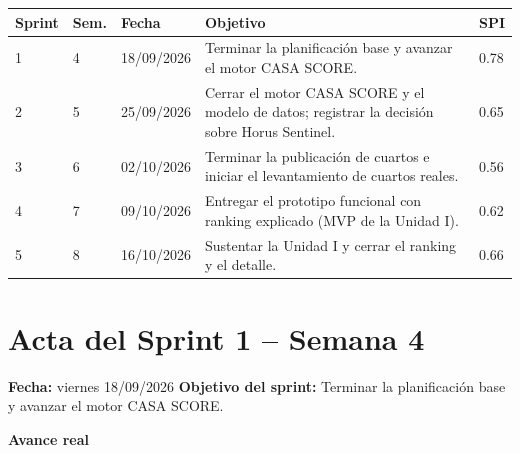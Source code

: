 \documentclass[11pt,a4paper]{article}
\begin{document}
\vspace{0.15cm}
{\small
{}
\noindent\begin{tabularx}{\textwidth}{@{}C{1.3cm} C{1.0cm} P{2.4cm} L C{1.4cm}@{}}
\toprule
{}
\textbf{Sprint} & \textbf{Sem.} & \textbf{Fecha} & \textbf{Objetivo} & \textbf{SPI} \\
\midrule


1 & 4 & 18/09/2026 & Terminar la planificación base y avanzar el motor CASA SCORE. & 0.78 \\

2 & 5 & 25/09/2026 & Cerrar el motor CASA SCORE y el modelo de datos; registrar la decisión sobre Horus Sentinel. & 0.65 \\

3 & 6 & 02/10/2026 & Terminar la publicación de cuartos e iniciar el levantamiento de cuartos reales. & 0.56 \\

4 & 7 & 09/10/2026 & Entregar el prototipo funcional con ranking explicado (MVP de la Unidad I). & 0.62 \\

5 & 8 & 16/10/2026 & Sustentar la Unidad I y cerrar el ranking y el detalle. & 0.66 \\

\bottomrule
\end{tabularx}
}


\section{Acta del Sprint 1 -- Semana 4}
\noindent\textbf{Fecha:} viernes 18/09/2026 \quad \textbar\quad \textbf{Objetivo del sprint:} Terminar la planificación base y avanzar el motor CASA SCORE.

\vspace{0.1cm}
\noindent\textbf{Avance real}
\end{document}

